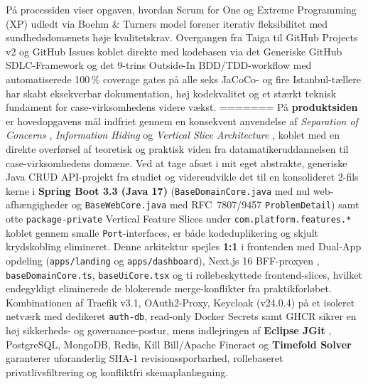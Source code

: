 \documentclass[11pt,a4paper]{article}
\begin{document}
\begin{table}[htbp]
\begin{table}[htbp]
På processiden viser opgaven, hvordan Scrum for One \cite{schwaber2020} og Extreme Programming (XP) \cite{beck2004} udledt via Boehm \& Turners model \cite{boehm2003} forener iterativ fleksibilitet med sundhedsdomænets høje kvalitetskrav. Overgangen fra Taiga til GitHub Projects v2 og GitHub Issues koblet direkte med kodebasen via det Generiske GitHub SDLC-Framework og det 9-trins Outside-In BDD/TDD-workflow med automatiserede 100\,\% coverage gates på alle seks JaCoCo- og fire Istanbul-tællere har skabt eksekverbar dokumentation, høj kodekvalitet og et stærkt teknisk fundament for case-virksomhedens videre vækst.
=======
På \textbf{produktsiden} er hovedopgavens mål indfriet gennem en konsekvent anvendelse af \textit{Separation of Concerns} \cite{fowler2002}, \textit{Information Hiding} \cite{parnas1972} og \textit{Vertical Slice Architecture} \cite{bogard2018}, koblet med en direkte overførsel af teoretisk og praktisk viden fra datamatikeruddannelsen til case-virksomhedens domæne. Ved at tage afsæt i mit eget abstrakte, generiske Java CRUD API-projekt fra studiet og videreudvikle det til en konsolideret 2-fils kerne i \textbf{Spring Boot 3.3 (Java 17)} (\texttt{BaseDomainCore.java} med nul web-afhængigheder og \texttt{BaseWebCore.java} med RFC~7807/9457 \texttt{ProblemDetail}) samt otte \texttt{package-private} Vertical Feature Slices under \texttt{com.platform.features.*} koblet gennem smalle \texttt{Port}-interfaces, er både kodeduplikering og skjult krydskobling elimineret. Denne arkitektur spejles \textbf{1:1} i frontenden med Dual-App opdeling (\texttt{apps/landing} og \texttt{apps/dashboard}), Next.js 16 BFF-proxyen \cite{newman2021}, \texttt{baseDomainCore.ts}, \texttt{baseUiCore.tsx} og ti rollebeskyttede frontend-slices, hvilket endegyldigt eliminerede de blokerende merge-konflikter fra praktikforløbet. Kombinationen af Traefik v3.1, OAuth2-Proxy, Keycloak (v24.0.4) på et isoleret netværk med dedikeret \texttt{auth-db}, read-only Docker Secrets samt GHCR sikrer en høj sikkerheds- og governance-postur, mens indlejringen af \textbf{Eclipse JGit} \cite{jgit2024}, PostgreSQL, MongoDB, Redis, Kill Bill/Apache Fineract og \textbf{Timefold Solver} \cite{timefold2024} garanterer uforanderlig SHA-1 revisionssporbarhed, rollebaseret privatlivsfiltrering og konfliktfri skemaplanlægning.


\end{table}
\end{table}
\end{document}
